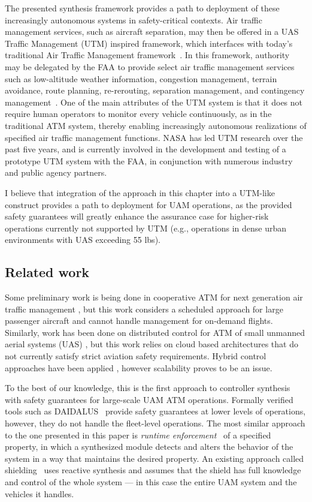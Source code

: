 The presented synthesis framework provides a path to deployment of these increasingly autonomous systems in safety-critical contexts.  Air traffic management services, such as aircraft separation, may then be offered in a UAS Traffic Management (UTM) inspired framework, which interfaces with today’s traditional Air Traffic Management framework~\cite{PRKRJJ2016}. In this framework,  authority may be delegated by the FAA to provide select air traffic management services such as low-altitude weather information, congestion management, terrain avoidance, route planning, re-rerouting, separation management, and contingency management~\cite{MBYDLGMC2018,NCDDASC2018}.  One of the main attributes of the UTM system is that it does not require human operators to monitor every vehicle continuously, as in the traditional ATM system, thereby enabling increasingly autonomous realizations of specified air traffic management functions.  NASA has led UTM research over the past five years, and is currently involved in the development and testing of a prototype UTM system with the FAA, in conjunction with numerous industry and public agency partners.  

I believe that integration of the approach in this chapter into a UTM-like construct provides a path to deployment for UAM operations, as the provided safety guarantees will greatly enhance the assurance case for higher-risk operations currently not supported by UTM (e.g., operations in dense urban environments with UAS exceeding 55 lbs).


\subsection{Related work}

 Some preliminary work is being done in cooperative ATM for next generation air traffic management \cite{prevot2005co}, but this work considers a scheduled approach for large passenger aircraft and cannot handle management for on-demand flights. Similarly, work has been done on distributed control for ATM of small unmanned aerial systems (UAS) \cite{FSLLK2015}, but this work relies on cloud based architectures that do not currently satisfy strict aviation safety requirements.  Hybrid control approaches have been applied \cite{tomlin1996hybrid}, however scalability proves to be an issue.


To the best of our knowledge, this is the first approach to
controller synthesis with safety guarantees for large-scale UAM ATM operations. Formally verified tools such as DAIDALUS~\cite{Daidalus} provide safety guarantees at lower levels of operations, however, they do not handle the fleet-level operations. The most similar approach to the one presented in this paper is \emph{runtime enforcement}~\cite{Falcone10,Schneider00} of a specified property, in which a synthesized module detects and alters the behavior of the system in a way that maintains the desired property. An existing approach called shielding~\cite{BloemKKW15,KonighoferABHKT17} uses reactive synthesis and assumes that the shield has full knowledge and control of the whole system --- in this case the entire UAM system and the vehicles it handles. 

